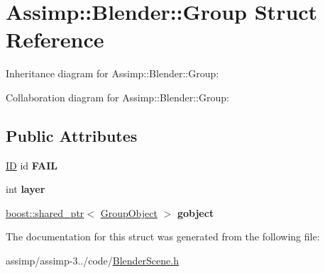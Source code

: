 \hypertarget{struct_assimp_1_1_blender_1_1_group}{\section{Assimp\+:\+:Blender\+:\+:Group Struct Reference}
\label{struct_assimp_1_1_blender_1_1_group}
}


Inheritance diagram for Assimp\+:\+:Blender\+:\+:Group\+:


Collaboration diagram for Assimp\+:\+:Blender\+:\+:Group\+:
\subsection*{Public Attributes}
\begin{DoxyCompactItemize}
\item 
\hypertarget{struct_assimp_1_1_blender_1_1_group_aea1f3a4e03d5b39d536d9c8ca0a04d3a}{\hyperlink{struct_assimp_1_1_blender_1_1_i_d}{I\+D} id {\bfseries F\+A\+I\+L}}\label{struct_assimp_1_1_blender_1_1_group_aea1f3a4e03d5b39d536d9c8ca0a04d3a}

\item 
\hypertarget{struct_assimp_1_1_blender_1_1_group_a9dd9ba63ce52ca595f6e8ce14b2ea89a}{int {\bfseries layer}}\label{struct_assimp_1_1_blender_1_1_group_a9dd9ba63ce52ca595f6e8ce14b2ea89a}

\item 
\hypertarget{struct_assimp_1_1_blender_1_1_group_a054812fda35abc57c61e6aea580cf052}{\hyperlink{classboost_1_1shared__ptr}{boost\+::shared\+\_\+ptr}$<$ \hyperlink{struct_assimp_1_1_blender_1_1_group_object}{Group\+Object} $>$ {\bfseries gobject}}\label{struct_assimp_1_1_blender_1_1_group_a054812fda35abc57c61e6aea580cf052}

\end{DoxyCompactItemize}


The documentation for this struct was generated from the following file\+:\begin{DoxyCompactItemize}
\item 
assimp/assimp-\/3../code/\hyperlink{_blender_scene_8h}{Blender\+Scene.\+h}\end{DoxyCompactItemize}
